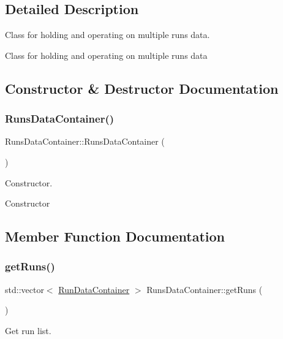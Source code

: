 \subsection{Detailed Description}
Class for holding and operating on multiple runs data. 

Class for holding and operating on multiple runs data 

\subsection{Constructor \& Destructor Documentation}
\mbox{\label{classRunsDataContainer_a7ed2dea1c915f02f2b44c27e1dabb1a6}} 
\subsubsection{\texorpdfstring{RunsDataContainer()}{RunsDataContainer()}}
{\footnotesize\ttfamily Runs\+Data\+Container\+::\+Runs\+Data\+Container (\begin{DoxyParamCaption}{ }\end{DoxyParamCaption})}



Constructor. 

Constructor 

\subsection{Member Function Documentation}
\mbox{\label{classRunsDataContainer_a893ead039b1509b3ae391358bd7d2ce6}} 
\subsubsection{\texorpdfstring{getRuns()}{getRuns()}}
{\footnotesize\ttfamily std\+::vector$<$ \mbox{\hyperlink{classRunDataContainer}{Run\+Data\+Container}} $>$ Runs\+Data\+Container\+::get\+Runs (\begin{DoxyParamCaption}{ }\end{DoxyParamCaption})}



Get run list. 

